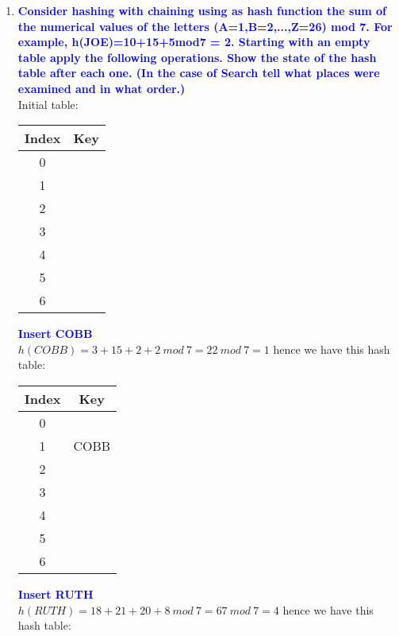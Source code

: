 \documentclass[11pt]{article}
\begin{document}
\begin{enumerate}
\begin{enumerate}
    \end{enumerate}
\item \textbf{\textcolor{blue}{Consider hashing with chaining using as hash function 
the sum of the numerical values of the letters (A=1,B=2,...,Z=26) mod 7. 
For example, h(JOE)=10+15+5mod7 = 2.  Starting with an empty table apply the following 
operations. Show the state of the hash table after each one. (In the
case of Search tell what places were examined and in what order.)}}
    \\ Initial table:
    \begin{center}
    \begin{tabular}{ | c | c | } 
        \hline
        Index & Key \\ 
        \hline\hline
        0 & \\
        \hline
        1 & \\
        \hline
        2 & \\
        \hline
        3 & \\
        \hline
        4 & \\
        \hline
        5 & \\
        \hline
        6 & \\
        \hline
    \end{tabular}
    \end{center}
\textbf{\textcolor{blue}{Insert COBB}}
    \\ $h(COBB)=3+15+2+2\ mod\ 7 = 22\ mod\ 7 = 1$ hence we have this hash table:
    \begin{center}
    \begin{tabular}{ | c | c | } 
        \hline
        Index & Key \\ 
        \hline\hline
        0 & \\
        \hline
        1 & COBB\\
        \hline
        2 & \\
        \hline
        3 & \\
        \hline
        4 & \\
        \hline
        5 & \\
        \hline
        6 & \\
        \hline
    \end{tabular}
    \end{center}
\textbf{\textcolor{blue}{Insert RUTH}}
    \\ $h(RUTH)=18+21+20+8\ mod\ 7 = 67\ mod\ 7 = 4$ hence we have this hash table:
    \begin{center}

\end{center}
\end{enumerate}
\end{document}
